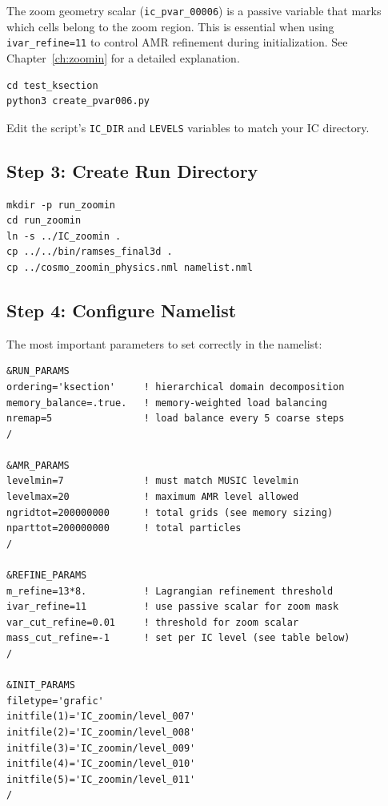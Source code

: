 \documentclass[11pt,fleqn]{book}
\begin{document}
The zoom geometry scalar (\texttt{ic\_pvar\_00006}) is a passive variable that marks which cells belong to the zoom region. This is essential when using \texttt{ivar\_refine=11} to control AMR refinement during initialization. See Chapter~\ref{ch:zoomin} for a detailed explanation.

\begin{codebox}
\begin{lstlisting}[style=bash,numbers=none]
cd test_ksection
python3 create_pvar006.py
\end{lstlisting}
\end{codebox}

Edit the script's \texttt{IC\_DIR} and \texttt{LEVELS} variables to match your IC directory.

\subsection{Step 3: Create Run Directory}

\begin{codebox}
\begin{lstlisting}[style=bash,numbers=none]
mkdir -p run_zoomin
cd run_zoomin
ln -s ../IC_zoomin .
cp ../../bin/ramses_final3d .
cp ../cosmo_zoomin_physics.nml namelist.nml
\end{lstlisting}
\end{codebox}

\subsection{Step 4: Configure Namelist}

The most important parameters to set correctly in the namelist:

\begin{codebox}
\begin{lstlisting}[style=fortran,numbers=none]
&RUN_PARAMS
ordering='ksection'     ! hierarchical domain decomposition
memory_balance=.true.   ! memory-weighted load balancing
nremap=5                ! load balance every 5 coarse steps
/

&AMR_PARAMS
levelmin=7              ! must match MUSIC levelmin
levelmax=20             ! maximum AMR level allowed
ngridtot=200000000      ! total grids (see memory sizing)
nparttot=200000000      ! total particles
/

&REFINE_PARAMS
m_refine=13*8.          ! Lagrangian refinement threshold
ivar_refine=11          ! use passive scalar for zoom mask
var_cut_refine=0.01     ! threshold for zoom scalar
mass_cut_refine=-1      ! set per IC level (see table below)
/

&INIT_PARAMS
filetype='grafic'
initfile(1)='IC_zoomin/level_007'
initfile(2)='IC_zoomin/level_008'
initfile(3)='IC_zoomin/level_009'
initfile(4)='IC_zoomin/level_010'
initfile(5)='IC_zoomin/level_011'
/
\end{lstlisting}
\end{codebox}
\end{document}
